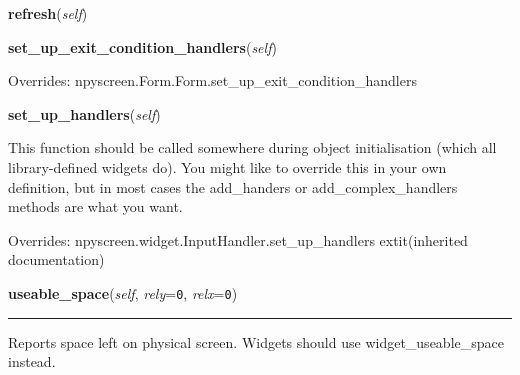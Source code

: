     \label{npyscreen:screen_area:ScreenArea:refresh}

    \vspace{0.5ex}

    \begin{boxedminipage}{\textwidth}

    \raggedright \textbf{refresh}(\textit{self})

    \end{boxedminipage}

    \vspace{0.5ex}

    \begin{boxedminipage}{\textwidth}

    \raggedright \textbf{set\_up\_exit\_condition\_handlers}(\textit{self})

      Overrides: npyscreen.Form.Form.set\_up\_exit\_condition\_handlers

    \end{boxedminipage}

    \vspace{0.5ex}

    \begin{boxedminipage}{\textwidth}

    \raggedright \textbf{set\_up\_handlers}(\textit{self})

    This function should be called somewhere during object initialisation 
    (which all library-defined widgets do). You might like to override this
    in your own definition, but in most cases the add\_handers or 
    add\_complex\_handlers methods are what you want.

    \vspace{1ex}

      Overrides: npyscreen.widget.InputHandler.set\_up\_handlers 	extit{(inherited documentation)}

    \end{boxedminipage}

    \label{npyscreen:Form:Form:useable_space}
    
    \vspace{0.5ex}

    \begin{boxedminipage}{\textwidth}

    \raggedright \textbf{useable\_space}(\textit{self}, \textit{rely}=\texttt{0}, \textit{relx}=\texttt{0})

    \vspace{-1.5ex}

    \rule{\textwidth}{0.5\fboxrule}
    Reports space left on physical screen. Widgets should use 
    widget\_useable\_space instead.

    \vspace{1ex}

    \end{boxedminipage}

